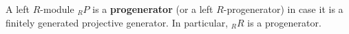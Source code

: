 A left $R$-module ${}_R P$ is a \textbf{progenerator} (or a left $R$-progenerator) in case it is a finitely generated projective generator. In particular, ${}_R R$ is a progenerator.
